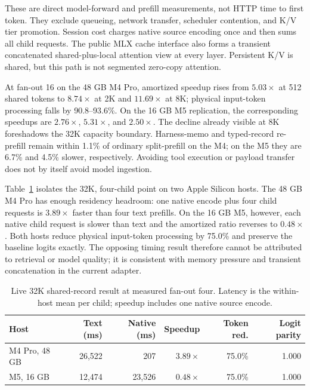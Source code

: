 \documentclass[11pt]{article}
\begin{document}
These are direct model-forward and prefill measurements, not HTTP time to first
token. They exclude queueing, network transfer, scheduler contention, and K/V
tier promotion. Session cost charges native source encoding once and then sums
all child requests. The public MLX cache interface also forms a transient
concatenated shared-plus-local attention view at every layer. Persistent K/V is
shared, but this path is not segmented zero-copy attention.

At fan-out 16 on the 48 GB M4 Pro, amortized speedup rises from
$5.03\times$ at 512 shared tokens to $8.74\times$ at 2K and $11.69\times$
at 8K; physical input-token processing falls by 90.8--93.6\%. On the 16 GB
M5 replication, the corresponding speedups are $2.76\times$,
$5.31\times$, and $2.50\times$. The decline already visible at 8K foreshadows
the 32K capacity boundary. Harness-memo and typed-record re-prefill remain
within 1.1\% of ordinary split-prefill on the M4; on the M5 they are 6.7\%
and 4.5\% slower, respectively. Avoiding tool execution or payload transfer
does not by itself avoid model ingestion.

Table~\ref{tab:mlx-pressure} isolates the 32K, four-child point on two Apple
Silicon hosts. The 48 GB M4 Pro has enough residency headroom: one native encode
plus four child requests is $3.89\times$ faster than four text prefills. On the
16 GB M5, however, each native child request is slower than text and the
amortized ratio reverses to $0.48\times$. Both hosts reduce physical input-token
processing by 75.0\% and preserve the baseline logits exactly. The opposing
timing result therefore cannot be attributed to retrieval or model quality; it
is consistent with memory pressure and transient concatenation in the current
adapter.

\begin{table}[H]
\centering
\small
\caption{Live 32K shared-record result at measured fan-out four. Latency is the
within-host mean per child; speedup includes one native source encode.}
\label{tab:mlx-pressure}
\begin{tabular}{lrrrrr}
\toprule
Host & Text (ms) & Native (ms) & Speedup & Token red. & Logit parity \\
\midrule
M4 Pro, 48 GB & 26,522 & 207 & $3.89\times$ & 75.0\% & 1.000 \\
M5, 16 GB & 12,474 & 23,526 & $0.48\times$ & 75.0\% & 1.000 \\
\bottomrule
\end{tabular}
\end{table}
\end{document}
